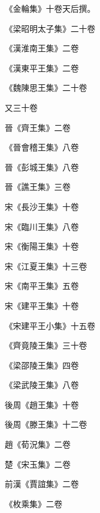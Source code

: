 \begin{pinyinscope}
 《金輪集》十卷天后撰。



 《梁昭明太子集》二十卷



 《漢淮南王集》二卷



 《漢東平王集》二卷



 《魏陳思王集》二十卷



 又三十卷



 晉《齊王集》二卷



 《晉會稽王集》八卷



 晉《彭城王集》八卷



 晉《譙王集》三卷



 宋《長沙王集》十卷



 宋《臨川王集》八卷



 宋《衡陽王集》十卷



 宋《江夏王集》十三卷



 宋《南平王集》五卷



 宋《建平王集》十卷



 《宋建平王小集》十五卷



 《齊竟陵王集》三十卷



 《梁邵陵王集》四卷



 《梁武陵王集》八卷



 後周《趙王集》十卷



 後周《滕王集》十二卷



 趙《荀況集》二卷



 楚《宋玉集》二卷



 前漢《賈誼集》二卷



 《枚乘集》二卷




\end{pinyinscope}
